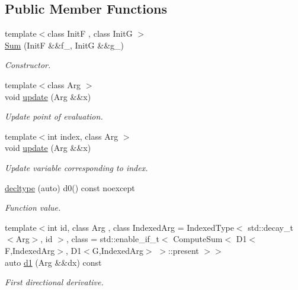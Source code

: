 \subsection*{\-Public \-Member \-Functions}
\begin{DoxyCompactItemize}
\item 
{\footnotesize template$<$class Init\-F , class Init\-G $>$ }\\\hyperlink{structFunG_1_1MathematicalOperations_1_1Sum_a7b04c111c5f6f2bafda3684f262d146e}{\-Sum} (\-Init\-F \&\&f\-\_\-, \-Init\-G \&\&g\-\_\-)
\begin{DoxyCompactList}\small\item\em \-Constructor. \end{DoxyCompactList}\item 
{\footnotesize template$<$class Arg $>$ }\\void \hyperlink{structFunG_1_1MathematicalOperations_1_1Sum_a15985be13a1838d868d2adce8e4f5402}{update} (\-Arg \&\&x)
\begin{DoxyCompactList}\small\item\em \-Update point of evaluation. \end{DoxyCompactList}\item 
{\footnotesize template$<$int index, class Arg $>$ }\\void \hyperlink{structFunG_1_1MathematicalOperations_1_1Sum_a4e10622e11a29d739f0d4db364980f9a}{update} (\-Arg \&\&x)
\begin{DoxyCompactList}\small\item\em \-Update variable corresponding to index. \end{DoxyCompactList}\item 
\hyperlink{structFunG_1_1MathematicalOperations_1_1Sum_a220cbc0bad7bbd35f8941601081a5cc9}{decltype} (auto) d0() const noexcept
\begin{DoxyCompactList}\small\item\em \-Function value. \end{DoxyCompactList}\item 
{\footnotesize template$<$int id, class Arg , class Indexed\-Arg  = \-Indexed\-Type$<$ std\-::decay\-\_\-t$<$\-Arg$>$, id $>$, class  = std\-::enable\-\_\-if\-\_\-t$<$ Compute\-Sum$<$ D1$<$\-F,\-Indexed\-Arg$>$, D1$<$\-G,\-Indexed\-Arg$>$ $>$\-::present $>$$>$ }\\auto \hyperlink{structFunG_1_1MathematicalOperations_1_1Sum_aee8c204769ab30f5ae68f9a8b0fa9bf8}{d1} (\-Arg \&\&dx) const 
\begin{DoxyCompactList}\small\item\em \-First directional derivative. \end{DoxyCompactList}\item 

\end{DoxyCompactItemize}
